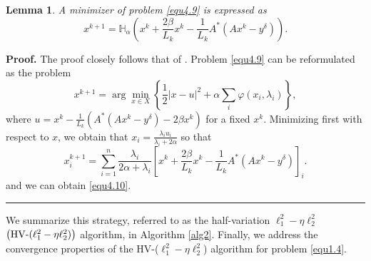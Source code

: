 \documentclass[a4paper,12pt]{article}
\newtheorem{lemma}[theorem]{Lemma}
\numberwithin{equation}{section}
\newenvironment{proof}[1][Proof]{\textbf{#1.} }
{\ \rule{0.75em}{0.75em}\smallskip}
\begin{document}
\begin{lemma}\label{lem4.8}
    A minimizer of problem \eqref{equ4.9} is expressed as
    \begin{equation}\label{equ4.10}
        x^{k+1}=\mathbb{H}_{\alpha}\left(x^{k}+\frac{2\beta}{L_{k}} x^{k}-\frac{1}{L_{k}}A^{*}\left(Ax^{k}-y^{\delta}\right)\right).
    \end{equation}
\end{lemma}
\begin{proof}
    The proof closely follows that of \cite[Lemma 6.70]{BA17}. Problem \eqref{equ4.9} can be reformulated as the problem
    \begin{equation}\label{equ4.11}
        x^{k+1}=\arg\min_{x\in X}\left\{\frac{1}{2}\left|x-u\right|^{2}+\alpha\sum_{i}\varphi(x_{i}, \lambda_{i})\right\},
    \end{equation}
    where $u=x^{k}-\frac{1}{L_{k}}\left(A^{*}\left(Ax^{k}-y^{\delta}\right)-2\beta x^{k}\right)$ for a fixed $x^{k}$. Minimizing first with respect to $x$, we obtain that $x_{i}=\frac{\lambda_{i}u_{i}}{\lambda_{i}+2\alpha}$ so that
    \begin{equation*}
        x^{k+1}_{i}=\sum_{i=1}^{n}\frac{\lambda_{i}}{2\alpha+\lambda_{i}}\left[x^{k}+\frac{2\beta}{L_{k}} x^{k}-\frac{1}{L_{k}}A^{*}\left(Ax^{k}-y^{\delta}\right)\right]_{i}.
    \end{equation*}
    and we can obtain \eqref{equ4.10}.
\end{proof}

\par We summarize this strategy, referred to as the half-variation $\ell_{1}^{2}-\eta\ell_{2}^{2}$ $\left({\rm HV}\text{-}(\ell_{1}^{2}-\eta\ell_{2}^{2})\right)$ algorithm, in Algorithm \ref{alg2}. Finally, we address the convergence properties of the HV-($\ell_{1}^{2}-\eta\ell_{2}^{2}$) algorithm for problem \eqref{equ1.4}.

\begin{algorithm}
\caption{HV-($\ell_{1}^{2}-\eta\ell_{2}^{2}$) algorithm for problem \eqref{equ1.4}}
\begin{algorithmic}\label{alg2}
\end{algorithmic}
\end{algorithm}
\end{document}
